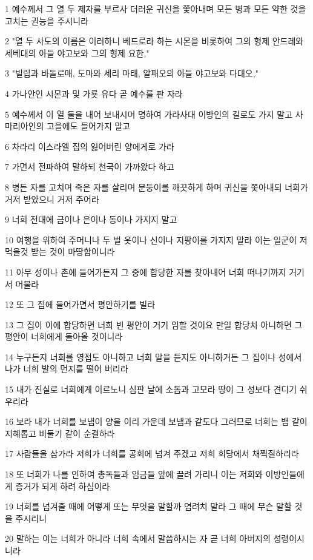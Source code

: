 \par 1 예수께서 그 열 두 제자를 부르사 더러운 귀신을 쫓아내며 모든 병과 모든 약한 것을 고치는 권능을 주시니라
\par 2 "열 두 사도의 이름은 이러하니 베드로라 하는 시몬을 비롯하여 그의 형제 안드레와 세베대의 아들 야고보와 그의 형제 요한,"
\par 3 "빌립과 바돌로매, 도마와 세리 마태, 알패오의 아들 야고보와 다대오,"
\par 4 가나안인 시몬과 및 가룟 유다 곧 예수를 판 자라
\par 5 예수께서 이 열 둘을 내어 보내시며 명하여 가라사대 이방인의 길로도 가지 말고 사마리아인의 고을에도 들어가지 말고
\par 6 차라리 이스라엘 집의 잃어버린 양에게로 가라
\par 7 가면서 전파하여 말하되 천국이 가까왔다 하고
\par 8 병든 자를 고치며 죽은 자를 살리며 문둥이를 깨끗하게 하며 귀신을 쫓아내되 너희가 거저 받았으니 거저 주어라
\par 9 너희 전대에 금이나 은이나 동이나 가지지 말고
\par 10 여행을 위하여 주머니나 두 벌 옷이나 신이나 지팡이를 가지지 말라 이는 일군이 저 먹을것 받는 것이 마땅함이니라
\par 11 아무 성이나 촌에 들어가든지 그 중에 합당한 자를 찾아내어 너희 떠나기까지 거기서 머물라
\par 12 또 그 집에 들어가면서 평안하기를 빌라
\par 13 그 집이 이에 합당하면 너희 빈 평안이 거기 임할 것이요 만일 합당치 아니하면 그 평안이 너희에게 돌아올 것이니라
\par 14 누구든지 너희를 영접도 아니하고 너희 말을 듣지도 아니하거든 그 집이나 성에서 나가 너희 발의 먼지를 떨어 버리라
\par 15 내가 진실로 너희에게 이르노니 심판 날에 소돔과 고모라 땅이 그 성보다 견디기 쉬우리라
\par 16 보라 내가 너희를 보냄이 양을 이리 가운데 보냄과 같도다 그러므로 너희는 뱀 같이 지혜롭고 비둘기 같이 순결하라
\par 17 사람들을 삼가라 저희가 너희를 공회에 넘겨 주겠고 저희 회당에서 채찍질하리라
\par 18 또 너희가 나를 인하여 총독들과 임금들 앞에 끌려 가리니 이는 저희와 이방인들에게 증거가 되게 하려 하심이라
\par 19 너희를 넘겨줄 때에 어떻게 또는 무엇을 말할까 염려치 말라 그 때에 무슨 말할 것을 주시리니
\par 20 말하는 이는 너희가 아니라 너희 속에서 말씀하시는 자 곧 너희 아버지의 성령이시니라

